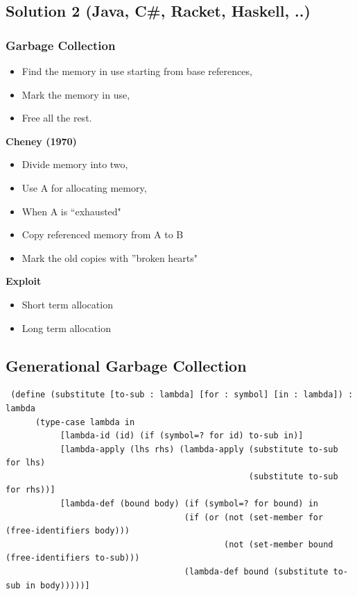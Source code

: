 \documentclass{article}
\begin{document}
\begin{flushleft}
\subsection*{Solution 2 (Java, C\#, Racket, Haskell, ..)}
\subsubsection*{Garbage Collection}
\begin{flushleft}
\begin{itemize}
 \item[] Find the memory in use starting from base references,
 \item[] Mark the memory in use,
 \item[] Free all the rest.
\end{itemize}
\bigskip
\textbf{Cheney (1970)}\\
 \begin{itemize}
  \item[] Divide memory into two,
  \item[] Use A for allocating memory,
  \item[] When A is ``exhausted"
  \item[] Copy referenced memory from A to B
  \item[] Mark the old copies with ''broken hearts"
 \end{itemize}
\bigskip
\textbf{Exploit}\\
\begin{itemize}
 \item Short term allocation
 \item Long term allocation
\end{itemize}
\end{flushleft}

\subsection*{Generational Garbage Collection}
\begin{verbatim}
 (define (substitute [to-sub : lambda] [for : symbol] [in : lambda]) : lambda
      (type-case lambda in
           [lambda-id (id) (if (symbol=? for id) to-sub in)]
           [lambda-apply (lhs rhs) (lambda-apply (substitute to-sub for lhs)
                                                 (substitute to-sub for rhs))]
           [lambda-def (bound body) (if (symbol=? for bound) in
                                    (if (or (not (set-member for (free-identifiers body)))
                                            (not (set-member bound (free-identifiers to-sub)))
                                    (lambda-def bound (substitute to-sub in body)))))]
\end{verbatim}
\end{flushleft}
\end{document}
